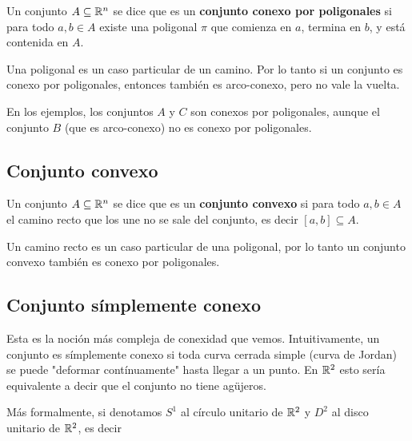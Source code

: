 \begin{definition}
Un conjunto $A \subseteq \mathbb{R}^n$ se dice que es un \textbf{conjunto conexo por poligonales} si para todo $a, b \in A$ existe una poligonal $\pi$ que comienza en $a$, termina en $b$, y está contenida en $A$.
\end{definition}

\begin{observation}
Una poligonal es un caso particular de un camino.  Por lo tanto si un conjunto es conexo por poligonales, entonces también es arco-conexo, pero no vale la vuelta.
\end{observation}

\begin{example}
En los ejemplos, los conjuntos $A$ y $C$ son conexos por poligonales, aunque el conjunto $B$ (que es arco-conexo) no es conexo por poligonales.
\end{example}

\subsection{Conjunto convexo}

\begin{definition}[Convexo]
Un conjunto $A \subseteq \mathbb{R}^n$ se dice que es un \textbf{conjunto convexo}  si para todo $a, b \in A$ el camino recto que los une no se sale del conjunto, es decir $[a,b] \subseteq A$.
\end{definition}

\begin{observation}
Un camino recto es un caso particular de una poligonal, por lo tanto un conjunto convexo también es conexo por poligonales.
\end{observation}

\subsection{Conjunto símplemente conexo}

Esta es la noción más compleja de conexidad que vemos.  Intuitivamente, un conjunto es símplemente conexo si toda curva cerrada simple (curva de Jordan) se puede "deformar contínuamente" hasta llegar a un punto.  En $ \mathbb{R}^2$ esto sería equivalente a decir que el conjunto no tiene agüjeros.  

Más formalmente, si denotamos $S^1$ al círculo unitario de $\mathbb{R}^2$ y $D^2$ al disco unitario de $\mathbb{R}^2$, es decir


